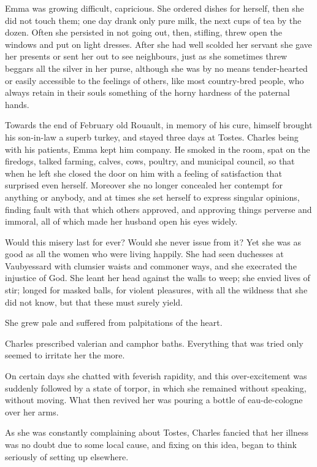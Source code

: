\documentclass{tufte-book}
\begin{document}
Emma was growing difficult, capricious. She ordered dishes for herself,
then she did not touch them; one day drank only pure milk, the next
cups of tea by the dozen. Often she persisted in not going out, then,
stifling, threw open the windows and put on light dresses. After she had
well scolded her servant she gave her presents or sent her out to see
neighbours, just as she sometimes threw beggars all the silver in her
purse, although she was by no means tender-hearted or easily accessible
to the feelings of others, like most country-bred people, who always
retain in their souls something of the horny hardness of the paternal
hands.

Towards the end of February old Rouault, in memory of his cure, himself
brought his son-in-law a superb turkey, and stayed three days at Tostes.
Charles being with his patients, Emma kept him company. He smoked in the
room, spat on the firedogs, talked farming, calves, cows, poultry, and
municipal council, so that when he left she closed the door on him with
a feeling of satisfaction that surprised even herself. Moreover she no
longer concealed her contempt for anything or anybody, and at times she
set herself to express singular opinions, finding fault with that which
others approved, and approving things perverse and immoral, all of which
made her husband open his eyes widely.

Would this misery last for ever? Would she never issue from it? Yet
she was as good as all the women who were living happily. She had seen
duchesses at Vaubyessard with clumsier waists and commoner ways, and she
execrated the injustice of God. She leant her head against the walls
to weep; she envied lives of stir; longed for masked balls, for violent
pleasures, with all the wildness that she did not know, but that these
must surely yield.

She grew pale and suffered from palpitations of the heart.

Charles prescribed valerian and camphor baths. Everything that was tried
only seemed to irritate her the more.

On certain days she chatted with feverish rapidity, and this
over-excitement was suddenly followed by a state of torpor, in which
she remained without speaking, without moving. What then revived her was
pouring a bottle of eau-de-cologne over her arms.

As she was constantly complaining about Tostes, Charles fancied that her
illness was no doubt due to some local cause, and fixing on this idea,
began to think seriously of setting up elsewhere.
\end{document}
